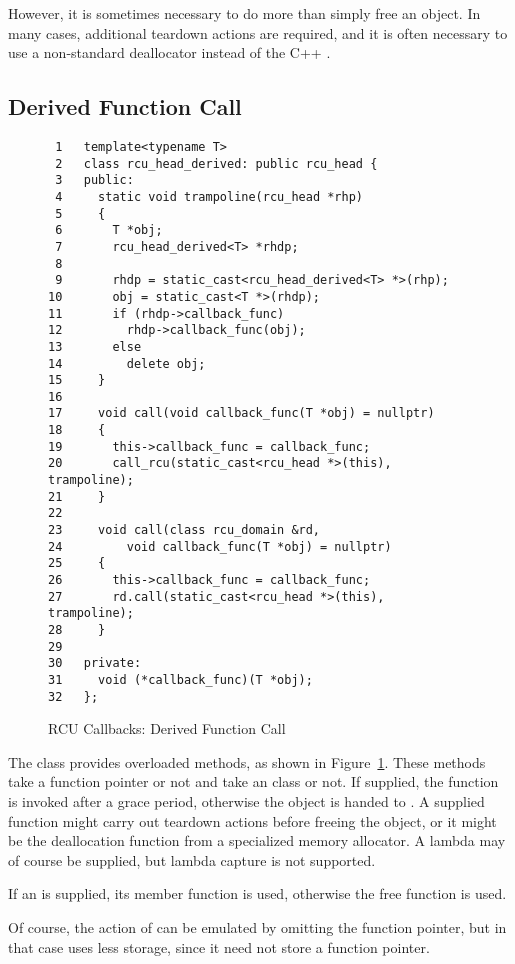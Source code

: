 \documentclass[letterpaper,twocolumn,10pt]{article}
\begin{document}
However, it is sometimes necessary to do more than simply free an
object.
In many cases, additional teardown actions are required, and
it is often necessary to use a non-standard deallocator instead
of the C++ .

\subsection{Derived Function Call}
\label{sec:Derived Function Call}

\begin{figure}[tbp]
{ \scriptsize
\begin{verbatim}
 1   template<typename T>
 2   class rcu_head_derived: public rcu_head {
 3   public:
 4     static void trampoline(rcu_head *rhp)
 5     {
 6       T *obj;
 7       rcu_head_derived<T> *rhdp;
 8
 9       rhdp = static_cast<rcu_head_derived<T> *>(rhp);
10       obj = static_cast<T *>(rhdp);
11       if (rhdp->callback_func)
12         rhdp->callback_func(obj);
13       else
14         delete obj;
15     }
16
17     void call(void callback_func(T *obj) = nullptr)
18     {
19       this->callback_func = callback_func;
20       call_rcu(static_cast<rcu_head *>(this), trampoline);
21     }
22
23     void call(class rcu_domain &rd,
24         void callback_func(T *obj) = nullptr)
25     {
26       this->callback_func = callback_func;
27       rd.call(static_cast<rcu_head *>(this), trampoline);
28     }
29
30   private:
31     void (*callback_func)(T *obj);
32   };
\end{verbatim}
}
\caption{RCU Callbacks: Derived Function Call}
\label{fig:RCU Callbacks: Derived Function Call}
\end{figure}

The  class provides overloaded  methods,
as shown in
Figure~\ref{fig:RCU Callbacks: Derived Function Call}.
These methods take a function pointer or not and take an
 class or not.
If supplied, the function is invoked after a grace period,
otherwise the object is handed to .
A supplied function might carry out teardown actions before freeing
the object, or it might be the deallocation function from a
specialized memory allocator.
A lambda may of course be supplied, but lambda capture is not supported.

If an  is supplied, its 
member function is used, otherwise the  free
function is used.

Of course, the action of  can be emulated by
omitting the function pointer, but in that case 
uses less storage, since it need not store a function pointer.
\end{document}
